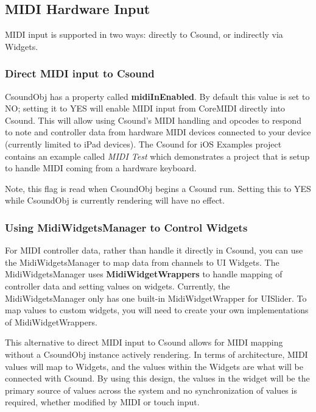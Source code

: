 \documentclass[11pt]{article}
\begin{document}
\subsection{MIDI Hardware Input}

MIDI input is supported in two ways: directly to Csound, or indirectly via Widgets. 

\subsubsection{Direct MIDI input to Csound}

CsoundObj has a property called \textbf{midiInEnabled}.  By default this value is set to NO; setting it to YES will enable MIDI input from CoreMIDI directly into Csound. This will allow using Csound's MIDI handling and opcodes to respond to note and controller data from hardware MIDI devices connected to your device (currently limited to iPad devices).  The Csound for iOS Examples project contains an example called \emph{MIDI Test} which demonstrates a project that is setup to handle MIDI coming from a hardware keyboard.

Note, this flag is read when CsoundObj begins a Csound run.  Setting this to YES while CsoundObj is currently rendering will have no effect. 

\subsubsection{Using MidiWidgetsManager to Control Widgets}

For MIDI controller data, rather than handle it directly in Csound, you can use the MidiWidgetsManager to map data from channels to UI Widgets.  The MidiWidgetsManager uses \textbf{MidiWidgetWrappers} to handle mapping of controller data and setting values on widgets.  Currently, the MidiWidgetsManager only has one built-in MidiWidgetWrapper for UISlider. To map values to custom widgets, you will need to create your own implementations of MidiWidgetWrappers. 

This alternative to direct MIDI input to Csound allows for MIDI mapping without a CsoundObj instance actively rendering. In terms of architecture, MIDI values will map to Widgets, and the values within the Widgets are what will be connected with Csound.  By using this design, the values in the widget will be the primary source of values across the system and no synchronization of values is required, whether modified by MIDI or touch input. 
\end{document}
